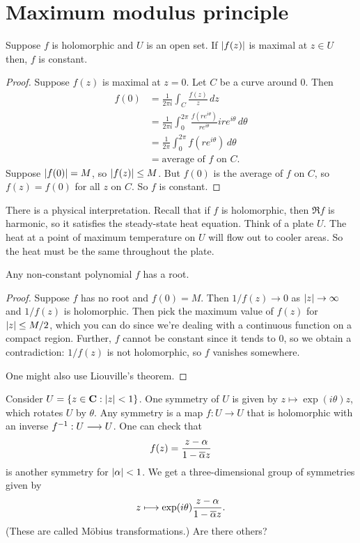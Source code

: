 \documentclass[11pt, oneside,margin=1in]{article}
\begin{document}
\section{Maximum modulus principle}

Suppose $f$ is holomorphic and $U$ is an open set. If $\left \lvert f(z) \right \rvert$ is maximal at $z\in U$ then, $f$ is constant.

\begin{proof}
Suppose $f(z)$ is maximal at $z=0$. Let $C$ be a curve around $0$. Then
 \begin{align*}
	 f(0)& = \frac{1}{2\pi i} \int_C \frac{f (z)}{z}\, dz\\ 
	     &= \frac{1}{2\pi i} \int_0^{2\pi} \frac{f(re^{i\theta})}{re^{i\theta}} ire^{i\theta}\, d\theta\\
	     &= \frac{1}{2\pi} \int_0^{2\pi} f (re^{i\theta}) \, d\theta\\
	     &= \textrm{average of $f$ on $C$.}
\end{align*}
Suppose $\left \lvert f(0) \right \rvert = M$, so $\left \lvert f(z) \right \rvert\le M$. But $f(0)$ is the average of $f$ on $C$, so $f(z)=f (0)$ for all $z$ on $C$. So $f$ is constant. 
\end{proof}

There is a physical interpretation. Recall that if $f$ is holomorphic, then $\Re f$ is harmonic, so it satisfies the steady-state heat equation. Think of a plate $U$. The heat at a point of maximum temperature on $U$ will flow out to cooler areas. So the heat must be the same throughout the plate.

\begin{theorem}\label{}\index{}\text{}
Any non-constant polynomial $f$ has a root.
\end{theorem}
\begin{proof}
Suppose $f$ has no root and $f(0)=M$. Then $1/f(z)\to 0$ as $\left \lvert z \right \rvert \to\infty$ and $1/f(z)$ is holomorphic. Then pick the maximum value of $f(z)$ for $\left \lvert z \right \rvert\le M/2$, which you can do since we're dealing with a continuous function on a compact region. Further, $f$ cannot be constant since it tends to $0$, so we obtain a contradiction: $1/f(z)$ is not holomorphic, so $f$ vanishes somewhere.

One might also use Liouville's theorem.
\end{proof}

Consider $U=\{z\in \mathbf C :\left \lvert z \right \rvert < 1\}$. One symmetry of $U$ is given by $z\longmapsto \exp(i\theta)z$, which rotates $U$ by $\theta$. Any symmetry is a map $f:U\longrightarrow U$ that is holomorphic with an inverse $f^{-1} : U\longrightarrow U$. One can check that
\begin{align*}
	f(z) = \frac{z-\alpha}{1-\overline\alpha z}
\end{align*}
is another symmetry for $\left \lvert \alpha \right \rvert < 1$. We get a three-dimensional group of symmetries given by 
\begin{align*}
	z \longmapsto \exp(i\theta) \frac{z-\alpha}{1-\overline\alpha z}.
\end{align*}
(These are called M\"obius transformations.) Are there others?
\end{document}
